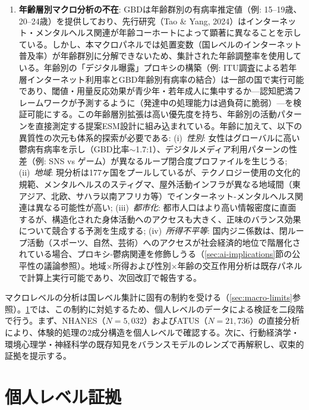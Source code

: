 \documentclass[a4paper,11pt,titlepage]{article}
\begin{document}
\begin{enumerate}
  \item \textbf{年齢層別マクロ分析の不在}: GBDは年齢群別の有病率推定値（例: 15--19歳、20--24歳）を提供しており、先行研究（Tao \& Yang, 2024）はインターネット・メンタルヘルス関連が年齢コーホートによって顕著に異なることを示している。しかし、本マクロパネルでは処置変数（国レベルのインターネット普及率）が年齢群別に分解できないため、集計された年齢調整率を使用している。年齢別の「デジタル曝露」プロキシの構築（例: ITU調査による若年層インターネット利用率とGBD年齢別有病率の結合）は一部の国で実行可能であり、閾値・用量反応効果が青少年・若年成人に集中するか---認知肥満フレームワークが予測するように（発達中の処理能力は過負荷に脆弱）---を検証可能にする。この年齢層別拡張は高い優先度を持ち、年齢別の活動パターンを直接測定する提案ESM設計に組み込まれている。年齢に加えて、以下の異質性の次元も体系的探索が必要である: (i)~\textit{性別}: 女性はグローバルに高い鬱病有病率を示し（GBD比率$\sim$1.7:1）、デジタルメディア利用パターンの性差（例: SNS vs ゲーム）が異なるループ閉合度プロファイルを生じうる; (ii)~\textit{地域}: 現分析は177ヶ国をプールしているが、テクノロジー使用の文化的規範、メンタルヘルスのスティグマ、屋外活動インフラが異なる地域間（東アジア、北欧、サハラ以南アフリカ等）でインターネット-メンタルヘルス関連は異なる可能性が高い; (iii)~\textit{都市化}: 都市人口はより高い情報密度に直面するが、構造化された身体活動へのアクセスも大きく、正味のバランス効果について競合する予測を生成する; (iv)~\textit{所得不平等}: 国内ジニ係数は、閉ループ活動（スポーツ、自然、芸術）へのアクセスが社会経済的地位で階層化されている場合、プロキシ-鬱病関連を修飾しうる（\ref{sec:ai-implications}節の公平性の議論参照）。地域$\times$所得および性別$\times$年齢の交互作用分析は既存パネルで計算上実行可能であり、次回改訂で報告する。
\end{enumerate}

マクロレベルの分析は国レベル集計に固有の制約を受ける（\cref{sec:macro-limits}参照）。\cref{sec:individual}では、この制約に対処するため、個人レベルのデータによる検証を二段階で行う。まず、NHANES（$N=5{,}032$）およびATUS（$N=21{,}736$）の直接分析により、体験的処理の2成分構造を個人レベルで確認する。次に、行動経済学・環境心理学・神経科学の既存知見をバランスモデルのレンズで再解釈し、収束的証拠を提示する。


\section{個人レベル証拠}\label{sec:individual}
\end{document}

